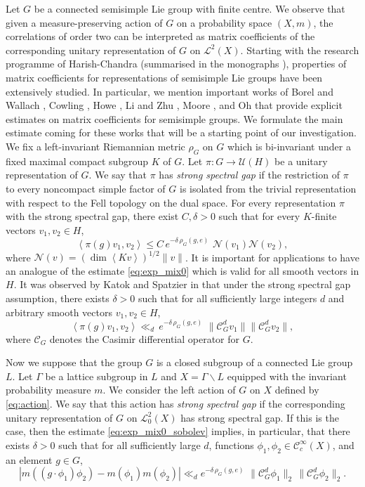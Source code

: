 \documentclass[11pt,reqno,a4paper]{amsart}
\numberwithin{equation}{section}
\newcommand{\cC}{\mathcal{C}}
\newcommand{\cL}{\mathcal{L}}
\newcommand{\cN}{\mathcal{N}}
\theoremstyle{theorem}
\theoremstyle{definition}
\begin{document}
Let $G$ be a connected semisimple Lie group with finite centre. We observe that given a measure-preserving action of $G$
on a probability space $(X,m)$, the correlations of order two can be interpreted as matrix
coefficients of the corresponding unitary representation of $G$ on $\cL^2(X)$.
Starting with the research programme of Harish-Chandra (summarised in the monographs \cite{war1,war2}), properties of 
matrix coefficients for representations of semisimple Lie groups have
been extensively studied. In particular, we mention important works 
of Borel and Wallach \cite{BW}, Cowling \cite{cowling}, Howe \cite{h}, 
Li and Zhu \cite{li,li2}, Moore \cite{m}, and  Oh \cite{oh1,oh2}
that provide explicit estimates on matrix coefficients for semisimple groups.
We formulate the main estimate coming for these works that will be a starting point of our investigation. 
We fix a left-invariant Riemannian metric $\rho_G$ on $G$ which is bi-invariant 
under a fixed maximal compact subgroup $K$ of $G$.
Let $\pi:G\to \mathcal{U}(H)$ be a unitary representation of $G$.
We say that $\pi$ has \emph{strong spectral gap}
if the restriction of $\pi$ to every noncompact simple factor of $G$ is isolated from the trivial representation with respect to the Fell topology on the dual space.
For every representation $\pi$ with the strong spectral gap, 
there 
exist $C,\delta>0$ such that 
for every $K$-finite vectors $v_1,v_2\in H$,
\begin{equation}\label{eq:exp_mix0}
\left<\pi(g)v_1,v_2\right>\le C\, e^{-\delta\, \rho_G(g,e)}\,\, \cN(v_1) \cN(v_2),
\end{equation}
where $\cN(v)=(\dim \left<Kv\right>)^{1/2} \|v\|$.
It is important for applications to have an analogue of
the estimate \eqref{eq:exp_mix0} which is valid for all smooth vectors in $H$.
It was observed by Katok and Spatzier in \cite{KS}
that under the strong spectral gap assumption, 
there exists $\delta>0$ such that
for all sufficiently large integers $d$
and arbitrary smooth vectors $v_1,v_2\in H$,
\begin{equation}\label{eq:exp_mix0_sobolev}
\left<\pi(g)v_1,v_2\right>\ll_d\, e^{-\delta\, \rho_G(g,e)}\,\, \|\cC_G^d v_1\| \|\cC_G^d v_2\|,
\end{equation}
where $\cC_G$ denotes the Casimir differential operator for $G$.

Now we suppose that the group $G$ is a closed subgroup 
of a connected Lie group $L$. Let $\Gamma$ be a lattice subgroup in $L$
and $X=\Gamma\backslash L$ equipped with the invariant probability measure $m$.
We consider the left action of $G$ on $X$
defined by \eqref{eq:action}.
We say that this action has \emph{strong spectral gap}
if the corresponding unitary representation of $G$ on $\cL^2_0(X)$
has strong spectral gap.
If this is the case, then the estimate \eqref{eq:exp_mix0_sobolev}
implies, in particular, that there exists $\delta>0$ such that
for all sufficiently large $d$, functions $\phi_1,\phi_2\in\cC_c^\infty(X)$, and an element $g\in G$,
\begin{equation}\label{eq:exp_mix}
| m((g \cdot \phi_1) \phi_2) - m(\phi_1) m(\phi_2) |
\ll_d
e^{-\delta \, \rho_G(g,e)} \,\, 
\|\cC_G^d \phi_1\|_2\, \|\cC_G^d \phi_2\|_2.
\end{equation}
\end{document}
